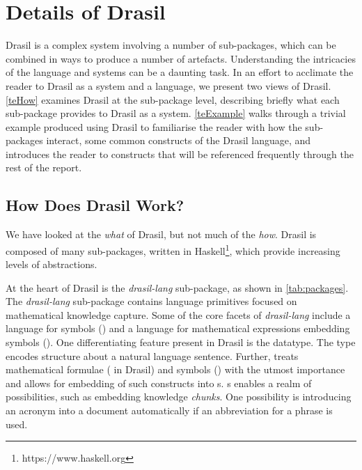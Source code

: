 \chapter{Details of Drasil}\label{toyexample}

Drasil is a complex system involving a number of sub-packages, which can be combined in ways to produce a number of artefacts. Understanding the intricacies of the language and systems can be a daunting task. In an effort to acclimate the reader to Drasil as a system and a language, we present two views of Drasil. \autoref{teHow} examines Drasil at the sub-package level, describing briefly what each sub-package provides to Drasil as a system. \autoref{teExample} walks through a trivial example produced using Drasil to familiarise the reader with how the sub-packages interact, some common constructs of the Drasil language, and introduces the reader to constructs that will be referenced frequently through the rest of the report.

\section{How Does Drasil Work?}\label{teHow}
We have looked at the \textit{what} of Drasil, but not much of the \textit{how}. Drasil is composed of many sub-packages, written in Haskell\footnote{https://www.haskell.org}, which provide increasing levels of abstractions. 

At the heart of Drasil is the \textit{drasil-lang} sub-package, as shown in \autoref{tab:packages}. The \textit{drasil-lang} sub-package contains language primitives focused on mathematical knowledge capture. Some of the core facets of \textit{drasil-lang} include a language for symbols () and a language for mathematical expressions embedding symbols (). One differentiating feature present in Drasil is the  datatype. The  type encodes structure about a natural language sentence. Further,  treats mathematical formulae ( in Drasil) and symbols () with the utmost importance and allows for embedding of such constructs into s. s enables a realm of possibilities, such as embedding knowledge \textit{chunks}. One possibility is introducing an acronym into a document automatically if an abbreviation for a phrase is used.

